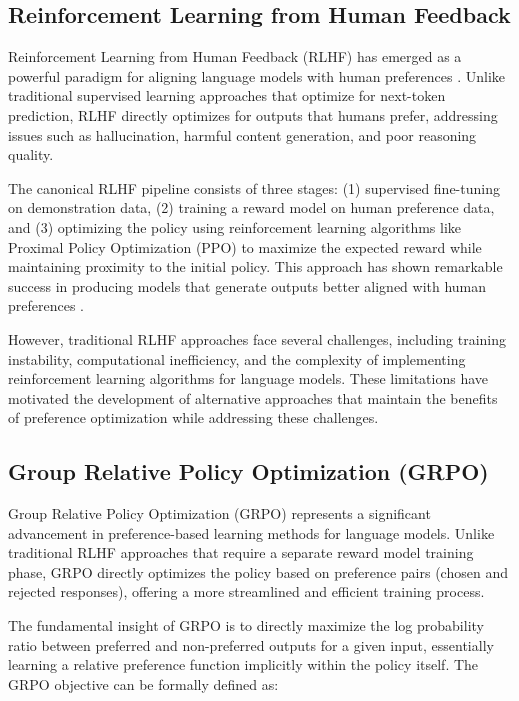 \documentclass[11pt,a4paper]{article}
\begin{document}
\subsection{Reinforcement Learning from Human Feedback}

Reinforcement Learning from Human Feedback (RLHF) has emerged as a powerful paradigm for aligning language models with human preferences \cite{christiano2017deep, stiennon2020learning, ouyang2022training}. Unlike traditional supervised learning approaches that optimize for next-token prediction, RLHF directly optimizes for outputs that humans prefer, addressing issues such as hallucination, harmful content generation, and poor reasoning quality.

The canonical RLHF pipeline consists of three stages: (1) supervised fine-tuning on demonstration data, (2) training a reward model on human preference data, and (3) optimizing the policy using reinforcement learning algorithms like Proximal Policy Optimization (PPO) \cite{schulman2017proximal} to maximize the expected reward while maintaining proximity to the initial policy. This approach has shown remarkable success in producing models that generate outputs better aligned with human preferences \cite{bai2022constitutional, touvron2023llama}.

However, traditional RLHF approaches face several challenges, including training instability, computational inefficiency, and the complexity of implementing reinforcement learning algorithms for language models. These limitations have motivated the development of alternative approaches that maintain the benefits of preference optimization while addressing these challenges.

\subsection{Group Relative Policy Optimization (GRPO)}

Group Relative Policy Optimization (GRPO) \cite{azar2023general} represents a significant advancement in preference-based learning methods for language models. Unlike traditional RLHF approaches that require a separate reward model training phase, GRPO directly optimizes the policy based on preference pairs (chosen and rejected responses), offering a more streamlined and efficient training process.

The fundamental insight of GRPO is to directly maximize the log probability ratio between preferred and non-preferred outputs for a given input, essentially learning a relative preference function implicitly within the policy itself. The GRPO objective can be formally defined as:
\end{document}
